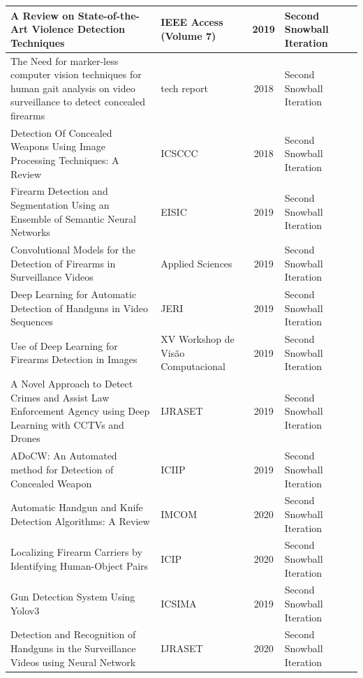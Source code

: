 {\begin{longtable}{|p{7.5cm}|p{2.5cm}|c|p{2cm}|p{2.2cm}|}
		\hline
		A Review on State-of-the-Art Violence Detection Techniques & IEEE Access (Volume 7) & 2019 & Second Snowball Iteration & \cite{ramzan2019review9}\\
		\hline
		The Need for marker-less computer vision techniques for human gait analysis on video surveillance to detect concealed firearms & tech report & 2018 & Second Snowball Iteration & \cite{muchiri2018need10}\\
		\hline
		Detection Of Concealed Weapons Using Image Processing Techniques: A Review & ICSCCC & 2018 & Second Snowball Iteration & \cite{mahajan2018detection11}\\
		\hline
		Firearm Detection and Segmentation Using an Ensemble of Semantic Neural Networks & EISIC & 2019 & Second Snowball Iteration & \cite{egiazarov2019firearm12}\\
		\hline
		Convolutional Models for the Detection of Firearms in Surveillance Videos & Applied Sciences & 2019 & Second Snowball Iteration & \cite{romero2019convolutional13}\\
		\hline
		Deep Learning for Automatic Detection of Handguns in Video Sequences & JERI & 2019 & Second Snowball Iteration & \cite{elmir2019deep14}\\
		\hline
		Use of Deep Learning for Firearms Detection in Images & XV Workshop de Visão Computacional & 2019 & Second Snowball Iteration & \cite{cardoso2019use15}\\
		\hline
		A Novel Approach to Detect Crimes and Assist Law Enforcement Agency using Deep Learning with CCTVs and Drones & IJRASET & 2019 & Second Snowball Iteration & \cite{pawarnovel16}\\
		\hline
		ADoCW: An Automated method for Detection of Concealed Weapon & ICIIP & 2019 & Second Snowball Iteration & \cite{raturi2019adocw17}\\
		\hline
		Automatic Handgun and Knife Detection Algorithms: A Review & IMCOM & 2020 & Second Snowball Iteration & \cite{warsi2020automatic18}\\
		\hline
		Localizing Firearm Carriers by Identifying Human-Object Pairs & ICIP & 2020 & Second Snowball Iteration & \cite{basit2020localizing19}\\
		\hline
		Gun Detection System Using Yolov3 & ICSIMA & 2019 & Second Snowball Iteration & \cite{warsi2019gun20}\\
		\hline
		Detection and Recognition of Handguns in the Surveillance Videos using Neural Network & IJRASET & 2020 & Second Snowball Iteration & \cite{guptadetection21}\\

\end{longtable}}
